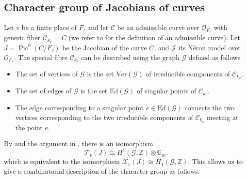 \documentclass[a4paper, notitlepage, 10pt]{amsart}
\theoremstyle{plain} %
\theoremstyle{definition} %
\theoremstyle{remark} %
\numberwithin{equation}{section}
\newcommand{\bbZ}{\mathbb Z}
\newcommand{\Pic}{\operatorname{Pic}} %
\begin{document}
\subsection{Character group of Jacobians of curves}\label{chargrpJac}
Let $v$ be a finite place of $F$, and let $\mathcal{C}$ be an admissible curve over $\mathcal{O}_{F_v}$ with generic fiber $\mathcal{C}_{F_v}=C$ (we refer to \cite[\S 3]{JL85} for the definition of an admissible curve). Let $J=\Pic^0(C/F_v)$ be the Jacobian of the curve $C$, and $\mathcal{J}$ its Néron model over $\mathcal{O}_{F_v}$. The special fibre $\mathcal{C}_{k_v}$ can be described using the graph $\mathcal{G}$ defined as follows
\begin{itemize}
    \item The set of vertices of $\mathcal{G}$ is the set $\text{Ver}(\mathcal{G})$ of irreducible components of $\mathcal{C}_{k_v}$.
    \item The set of edges of $\mathcal{G}$ is the set $\text{Ed}(\mathcal{G})$ of singular points of $\mathcal{C}_{k_v}$.
    \item The edge corresponding to a singular point $e\in \text{Ed}(\mathcal{G})$ connects the two vertices corresponding to the two irreducible components of $\mathcal{C}_{k_v}$ meeting at the point $e$.
\end{itemize}
By \cite[Exposé IX 12.3.7]{SGA7I} and the argument in \cite[§2]{Ribet90}, there is an isomorphism
\begin{equation*}
    \mathcal{T}_v(J)\cong H^1(\mathcal{G},\bbZ)\otimes \mathbb{G}_m.
\end{equation*}
which is equivalent to the isomorphism $    \mathcal{X}_v(J)\cong H_1(\mathcal{G},\bbZ)$.
This allows us to give a combinatorial description of the character group as follows.
\end{document}
